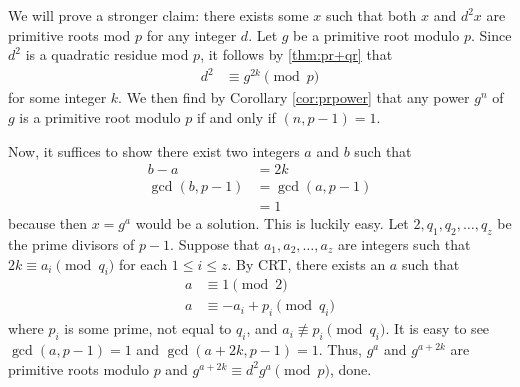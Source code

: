 \begin{solution}
	We will prove a stronger claim: there exists some $x$ such that both $x$ and $d^2x$ are primitive roots mod $p$ for any integer $d$. Let $g$ be a primitive root modulo $p$. Since $d^2$ is a quadratic residue mod $p$, it follows by \autoref{thm:pr+qr} that
		\begin{align*}
			d^2
				& \equiv g^{2k} \pmod{p}
		\end{align*}
	for some integer $k$. We then find by Corollary \ref{cor:prpower} that any power $g^n$ of $g$ is a primitive root modulo $p$ if and only if $(n, p-1)=1$.

	Now, it suffices to show there exist two integers $a$ and $b$ such that
		\begin{align*}
			b-a
				& = 2k\\
			\gcd(b,p-1)
				& = \gcd(a,p-1)\\
				& = 1
		\end{align*}
	because then $x=g^a$ would be a solution.
	This is luckily easy. Let $2,q_1,q_2,\ldots,q_z$ be the prime divisors of $p-1$. Suppose that $a_1,a_2,\ldots,a_z$ are integers such that $2k \equiv a_i \pmod{q_i}$ for each $1 \le i \le z$.
	By CRT, there exists an $a$ such that
		\begin{align*}
			a
				& \equiv 1 \pmod{2}\\
			a
				& \equiv -a_i + p_i \pmod{q_i}
		\end{align*}
	where $p_i$ is some prime, not equal to $q_i$, and $a_i \not \equiv p_i \pmod{q_i}$. It is easy to see $\gcd(a,p-1) = 1$ and $\gcd(a+2k, p-1) = 1$. Thus, $g^a$ and $g^{a+2k}$ are primitive roots modulo $p$ and $g^{a+2k} \equiv d^2g^a \pmod{p}$, done.
\end{solution}
